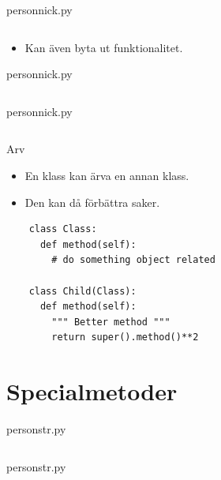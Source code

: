 \begin{frame}[fragile]
  person\textunderscore nick.py \hrulefill
  \inputminted[linenos,firstline=3,lastline=18]{python}{examples/person_nick.py}
\end{frame}

\begin{frame}[fragile]
  \begin{remark}
    \begin{itemize}
      \item Kan även byta ut funktionalitet.
    \end{itemize}
  \end{remark}
  person\textunderscore nick.py \hrulefill
  \inputminted[linenos,firstline=20,lastline=28]{python}{examples/person_nick.py}
\end{frame}

\begin{frame}[fragile]
  person\textunderscore nick.py \hrulefill
  \inputminted[linenos,firstline=30]{python}{examples/person_nick.py}
\end{frame}

\begin{frame}[fragile]
  \begin{block}{Arv}
    \begin{itemize}
      \item En klass kan ärva en annan klass.
      \item Den kan då förbättra saker.
    \end{itemize}
  \end{block}

  \begin{verbatim}
    class Class:
      def method(self):
        # do something object related

    class Child(Class):
      def method(self):
        """ Better method """
        return super().method()**2
  \end{verbatim}
\end{frame}


\section{Specialmetoder}

\begin{frame}[fragile]
  person\textunderscore str.py \hrulefill
  \inputminted[linenos,lastline=8]{python}{examples/person_str.py}
\end{frame}

\begin{frame}[fragile]
  person\textunderscore str.py \hrulefill
  \inputminted[linenos,firstline=11]{python}{examples/person_str.py}
\end{frame}

